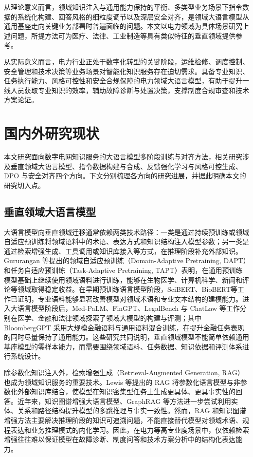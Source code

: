\documentclass[fontset=fandol,type=master,campus=shenzhen,etitleauto=true]{hithesisbook}
\begin{document}
从理论意义而言，领域知识注入与通用能力保持的平衡、多类型业务场景下指令数据的系统化构建、回答风格的细粒度调节以及深层安全对齐，是领域大语言模型从通用基座走向关键业务部署时普遍面临的问题。本文以电力领域为具体场景研究上述问题，所提方法可为医疗、法律、工业制造等具有类似特征的垂直领域提供参考。

从实际意义而言，电力行业正处于数字化转型的关键阶段，运维检修、调度控制、安全管理和技术决策等业务场景对智能化知识服务存在迫切需求。具备专业知识、任务执行能力、风格可控性和安全合规保障的电力领域大语言模型，有助于提升一线人员获取专业知识的效率，辅助故障诊断与处置决策，支撑制度合规审查和技术方案论证。


\section{国内外研究现状}\label{ux56fdux5185ux5916ux7814ux7a76ux73b0ux72b6}

本文研究面向数字电网知识服务的大语言模型多阶段训练与对齐方法，相关研究涉及垂直领域大语言模型、指令数据构建与合成、反馈强化学习与风格可控生成、DPO 与安全对齐四个方向。下文分别梳理各方向的研究进展，并据此明确本文的研究切入点。

\subsection{垂直领域大语言模型}

大语言模型向垂直领域迁移通常依赖两类技术路径：一类是通过持续预训练或领域自适应预训练将领域语料中的术语、表达方式和知识结构注入模型参数；另一类是通过检索增强生成、工具调用或知识库接入等方式，在推理阶段补充外部知识。Gururangan 等提出的领域自适应预训练（Domain-Adaptive Pretraining, DAPT）和任务自适应预训练（Task-Adaptive Pretraining, TAPT）表明，在通用预训练模型基础上继续使用领域语料进行训练，能够在生物医学、计算机科学、新闻和评论等领域取得稳定收益\cite{ref6}。在早期预训练语言模型阶段，SciBERT\cite{ref7}、BioBERT\cite{ref8}等工作已证明，专业语料能够显著改善模型对领域术语和专业文本结构的建模能力。进入大语言模型阶段后，Med-PaLM\cite{ref9}、FinGPT\cite{ref11}、LegalBench 与 ChatLaw\cite{ref12,ref13} 等工作分别在医学、金融和法律领域探索了领域大模型的构建与评测；其中 BloombergGPT 采用大规模金融语料与通用语料混合训练，在提升金融任务表现的同时尽量保持了通用能力\cite{ref10}。这些研究共同说明，垂直领域模型不能简单依赖通用基座模型的零样本能力，而需要围绕领域语料、任务数据、知识依据和评测体系进行系统设计。

除参数化知识注入外，检索增强生成（Retrieval-Augmented Generation, RAG）也成为领域知识服务的重要技术。Lewis 等提出的 RAG 将参数化语言模型与非参数化外部知识库结合，使模型在知识密集型任务上生成更具体、更具事实性的回答\cite{ref14}。近年来，知识图谱增强大语言模型、GraphRAG 等方法进一步尝试利用实体、关系和路径结构提升模型的多跳推理与事实一致性\cite{ref15,ref16}。然而，RAG 和知识图谱增强方法主要解决推理阶段的知识可追溯问题，不能直接替代模型对领域术语、规程表达和业务推理模式的内化学习。因此，在电力等高专业度场景中，仅依赖检索增强往往难以保证模型在故障诊断、制度问答和技术方案分析中的结构化表达能力。
\end{document}
